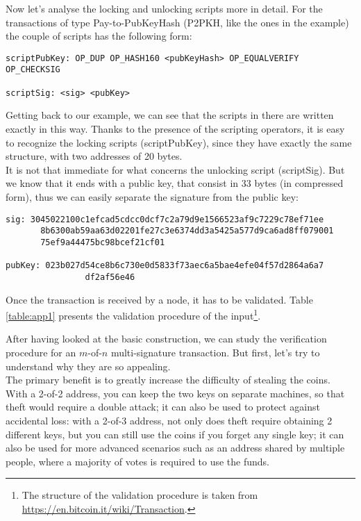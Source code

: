 \bigskip
\noindent
Now let's analyse the locking and unlocking scripts more in detail. For the transactions of type Pay-to-PubKeyHash (P2PKH, like the ones in the example) the couple of scripts has the following form:

\bigskip
\begin{lstlisting}[frame=single]
scriptPubKey: OP_DUP OP_HASH160 <pubKeyHash> OP_EQUALVERIFY 							 OP_CHECKSIG

scriptSig: <sig> <pubKey>
\end{lstlisting}

\bigskip
\noindent
Getting back to our example, we can see that the scripts in there are written exactly in this way. Thanks to the presence of the scripting operators, it is easy to recognize the locking scripts (scriptPubKey), since they have exactly the same structure, with two addresses of 20 bytes.
\\
It is not that immediate for what concerns the unlocking script (scriptSig). But we know that it ends with a public key, that consist in 33 bytes (in compressed form), thus we can easily separate the signature from the public key:

\bigskip

\begin{lstlisting}[frame=single]
sig: 3045022100c1efcad5cdcc0dcf7c2a79d9e1566523af9c7229c78ef71ee
	   8b6300ab59aa63d02201fe27c3e6374dd3a5425a577d9ca6ad8ff079001
	   75ef9a44475bc98bcef21cf01
	   
pubKey: 023b027d54ce8b6c730e0d5833f73aec6a5bae4efe04f57d2864a6a7
				df2af56e46
\end{lstlisting}
Once the transaction is received by a node, it has to be validated. Table \ref{table:app1} presents the validation procedure of the input\footnote{The structure of the validation procedure is taken from \url{https://en.bitcoin.it/wiki/Transaction}.}.

\bigskip
\noindent
After having looked at the basic construction, we can study the verification procedure for an $m$-of-$n$ multi-signature transaction. But first, let's try to understand why they are so appealing. 
\\
The primary benefit is to greatly increase the difficulty of stealing the coins. With a 2-of-2 address, you can keep the two keys on separate machines, so that theft would require a double attack; it can also be used to protect against accidental loss: with a 2-of-3 address, not only does theft require obtaining 2 different keys, but you can still use the coins if you forget any single key; it can also be used for more advanced scenarios such as an address shared by multiple people, where a majority of votes is required to use the funds.

